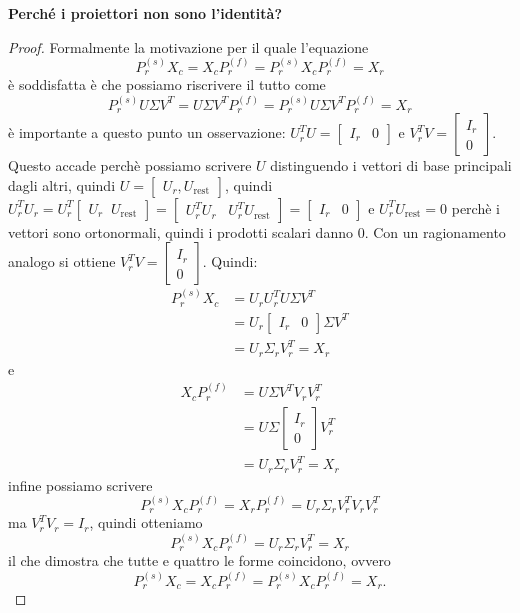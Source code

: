 \documentclass[10pt,a4paper]{article}
\begin{document}
\textbf{Perché i proiettori non sono l'identità?}
\begin{proof}
Formalmente la motivazione per il quale l'equazione 
\[
P_r^{(s)}X_c= X_cP_r^{(f)}=
P_r^{(s)}X_cP_r^{(f)}= X_r
\]
è soddisfatta è che possiamo riscrivere il tutto come
\[
P_r^{(s)}U\Sigma V^T=U\Sigma V^TP_r^{(f)}=
P_r^{(s)}U\Sigma V^TP_r^{(f)}= X_r
\]
è importante a questo punto un osservazione: $U^T_rU=\begin{bmatrix} I_r & 0 \end{bmatrix}$ e 
$V^T_rV=\begin{bmatrix} I_r\\0\end{bmatrix}$. Questo accade perchè possiamo scrivere $U$ distinguendo i 
vettori di base principali dagli altri, quindi $U=\begin{bmatrix}U_r, U_{\text{rest}}\end{bmatrix}$, quindi 
$U^T_rU_r=U_r^T\begin{bmatrix} U_r\;\;U_\text{rest}\end{bmatrix}=\begin{bmatrix} U^T_rU_r\;\;\;U^T_rU_\text{rest}\end{bmatrix}
=\begin{bmatrix} I_r & 0 \end{bmatrix}$ 
e $U_r^TU_\text{rest}=0$ perchè i vettori sono ortonormali, quindi i prodotti scalari 
danno 0. Con un ragionamento analogo si ottiene $V^T_rV=\begin{bmatrix} I_r\\0\end{bmatrix}$. Quindi:
\[
\begin{aligned}
    P_r^{(s)}X_c&
    =U_rU^T_rU\Sigma V^T\\&
    =U_r\begin{bmatrix} I_r & 0 \end{bmatrix}\Sigma V^T\\&
    =U_r\Sigma_rV_r^T=X_r
\end{aligned}
\]
e
\[
\begin{aligned}
    X_cP_r^{(f)}
    &=U\Sigma V^TV_rV_r^T\\
    &=U\Sigma\begin{bmatrix}I_r\\0\end{bmatrix}V_r^T\\
    &=U_r\Sigma_rV_r^T
    =X_r
\end{aligned}
\]
infine possiamo scrivere \[P_r^{(s)}X_cP_r^{(f)} = X_rP_r^{(f)}=U_r\Sigma_rV_r^TV_rV_r^T\]
ma $V_r^TV_r=I_r$, quindi otteniamo \[P_r^{(s)}X_cP_r^{(f)}=U_r\Sigma_rV_r^T=X_r\]
il che dimostra che tutte e quattro le forme coincidono, ovvero
\[
P_r^{(s)}X_c= X_cP_r^{(f)}=
P_r^{(s)}X_cP_r^{(f)}= X_r.
\]
\end{proof}
\end{document}
